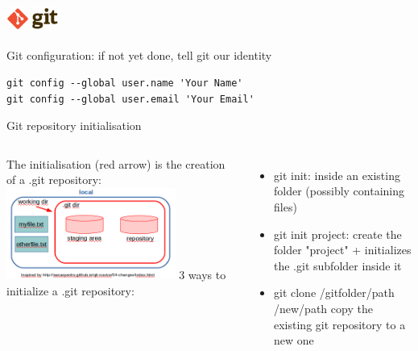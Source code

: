 \begin{frame}[containsverbatim]
\frametitle{\includegraphics[height=0.8cm]{shared/logo-git.png} }
\begin{block}{Git configuration: if not yet done, tell git our identity}
\begin{lstlisting}
git config --global user.name 'Your Name'
git config --global user.email 'Your Email'
\end{lstlisting}
\end{block}
\begin{block}{Git repository initialisation}
\begin{columns}
   The initialisation (red arrow) is the creation of a .git repository:
   \includegraphics[height=3cm]{05_history/Images/FAIR_git_init.png}
   3 ways to initialize a .git repository:
   \begin{itemize}
       \item git init: inside an existing folder (possibly containing files)
       \item git init project: create the folder "project" + initializes the .git subfolder inside it
       \item git clone /gitfolder/path /new/path copy the existing git repository to a new one
    \end{itemize}
\end{columns}
\end{block}
\end{frame}

